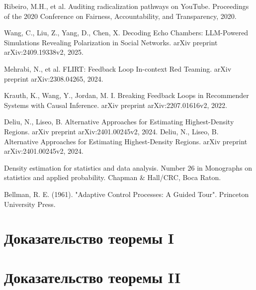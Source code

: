 \documentclass{article}
\begin{document}
\begin{thebibliography}{10}
Ribeiro, M.H., et al. Auditing radicalization pathways on YouTube. Proceedings of the 2020 Conference on Fairness, Accountability, and Transparency, 2020.


Wang, C., Liu, Z., Yang, D., Chen, X. Decoding Echo Chambers: LLM-Powered Simulations Revealing Polarization in Social Networks. arXiv preprint arXiv:2409.19338v2, 2025.



 Mehrabi, N., et al. FLIRT: Feedback Loop In-context Red Teaming. arXiv preprint arXiv:2308.04265, 2024.



 Krauth, K., Wang, Y., Jordan, M. I. Breaking Feedback Loops in Recommender Systems with Causal Inference. arXiv preprint arXiv:2207.01616v2, 2022.

 Deliu, N., Liseo, B. Alternative Approaches for Estimating Highest-Density Regions. arXiv preprint arXiv:2401.00245v2, 2024. Deliu, N., Liseo, B. Alternative Approaches for Estimating Highest-Density Regions. arXiv preprint arXiv:2401.00245v2, 2024.


 Density estimation for statistics and data analysis. Number 26 in Monographs on statistics and applied probability. Chapman & Hall/CRC, Boca Raton.

 Bellman, R. E. (1961). "Adaptive Control Processes: A Guided Tour". Princeton University Press.

\end{thebibliography}

\newpage
\appendix
\section{Доказательство теоремы I}\label{app:A}

\section{Доказательство теоремы II}\label{app:B}
\end{document}

